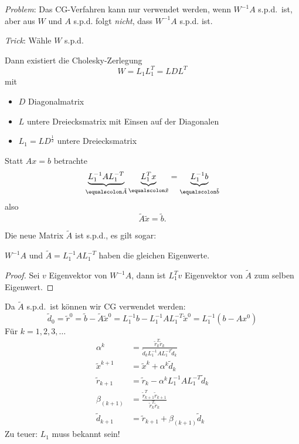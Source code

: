 \medskip

\emph{Problem}: Das CG-Verfahren kann nur verwendet werden, wenn $W^{-1}A$ s.p.d.\ ist,\\
 aber aus $W$ und $A$ s.p.d. folgt \emph{nicht}, dass $W^{-1}A$ s.p.d. ist.

\medskip

\emph{Trick}: Wähle $W$ s.p.d.

Dann existiert die Cholesky-Zerlegung
\begin{equation*}
 W=L_1L_1^T=LDL^T
\end{equation*}
mit
\begin{itemize}
 \item $D$ Diagonalmatrix
 \item $L$ untere Dreiecksmatrix mit Einsen auf der Diagonalen
 \item $L_1=LD^{\frac{1}{2}}$ untere Dreiecksmatrix
\end{itemize}
Statt $Ax=b$ betrachte
\begin{equation*}
 \underbrace{L_1^{-1}AL_1^{-T}}_{\equalscolon \tilde{A}} \underbrace{L_1^Tx}_{\equalscolon\tilde{x}}
 =
 \underbrace{L_1^{-1}b}_{\equalscolon\tilde{b}}
\end{equation*}
also
\begin{equation*}
 \tilde{A} \tilde{x} = \tilde{b}.
\end{equation*}

Die neue Matrix $\tilde{A}$ ist s.p.d., es gilt sogar:

\begin{satz}
$W^{-1}A$ und $\tilde{A} = L_1^{-1}AL_1^{-T}$ haben die gleichen Eigenwerte.
\end{satz}
\begin{proof}
Sei $v$ Eigenvektor von $W^{-1}A$, dann ist $L_1^Tv$ Eigenvektor von $\tilde{A}$ zum selben Eigenwert.
\end{proof}

Da $\tilde{A}$ s.p.d.\ ist können wir CG verwendet werden:
\begin{equation*}
 \tilde{d}_0
 =
 \tilde{r}^0
 =
 \tilde{b}-\tilde{A} \tilde{x}^0
 =
 L_1^{-1}b-L_1^{-1}AL_1^{-T} \tilde{x}^0
 =
 L_1^{-1} (b-Ax^0)
\end{equation*}
Für $k=1,2,3,\ldots$
\begin{align*}
 \alpha^k & =\frac{\tilde{r}_k^T \tilde{r}_k}{\tilde{d}_kL_1^{-1}A L_1^{-T} \tilde{d}_k} \\
 \tilde{x}^{k+1} & =\tilde{x}^k+\alpha^k \tilde{d}_k \\
 \tilde{r}_{k+1} & =\tilde{r}_k-\alpha^k L_1^{-1}AL_1^{-T} \tilde{d}_k \\
 \beta_{(k+1)} & =\frac{\tilde{r}_{k+1}^T \tilde{r}_{k+1}}{\tilde{r}_k^T \tilde{r}_k} \\
 \tilde{d}_{k+1} & =\tilde{r}_{k+1}+\beta_{(k+1)} \tilde{d}_k
\end{align*}
Zu teuer: $L_1$ muss bekannt sein!

